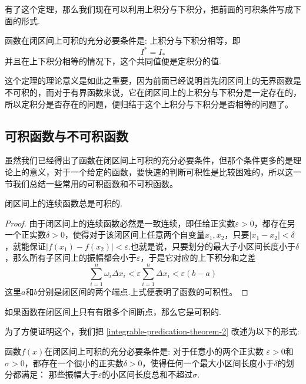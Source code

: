 有了这个定理，那么我们现在可以利用上积分与下积分，把前面的可积条件写成下面的形式.
\begin{theorem}
  函数在闭区间上可积的充分必要条件是: 上积分与下积分相等，即
  \[ I^{*} = I_{*} \]
  并且在上下积分相等的情况下，这个共同值便是定积分的值.
\end{theorem}

这个定理的理论意义是如此之重要，因为前面已经说明首先闭区间上的无界函数是不可积的，而对于有界函数来说，它在闭区间上的上积分与下积分是一定存在的，所以定积分是否存在的问题，便归结于这个上积分与下积分是否相等的问题了。

\subsection{可积函数与不可积函数}
\label{sec:integrable-and-not-function}

虽然我们已经得出了函数在闭区间上可积的充分必要条件，但那个条件更多的是理论上的意义，对于一个给定的函数，要快速的判断可积性是比较困难的，所以这一节我们总结一些常用的可积函数和不可积函数。

\begin{theorem}
  闭区间上的连续函数总是可积的.
\end{theorem}

\begin{proof}
  由于闭区间上的连续函数必然是一致连续，即任给正实数$\varepsilon>0$，都存在另一个正实数$\delta>0$，使得对于该闭区间上任意两个自变量$x_1,x_2$，只要$|x_1-x_2|<\delta$，就能保证$|f(x_1)-f(x_2)|<\varepsilon$.也就是说，只要划分的最大子小区间长度小于$\delta$，那么所有子区间上的振幅都会小于$\varepsilon$，于是它对应的上下积分和之差
  \[ \sum_{i=1}^n \omega_i \Delta x_i < \varepsilon \sum_{i=1}^n \Delta x_i < \varepsilon (b-a) \]
  这里$a$和$b$分别是闭区间的两个端点.上式便表明了函数的可积性。
\end{proof}

\begin{theorem}
  如果函数在闭区间上只有有限多个间断点，那么它是可积的.
\end{theorem}

为了方便证明这个，我们把 \autoref{integrable-predication-theorem-2} 改述为以下的形式:
\begin{theorem}
  \label{integrable-predication-theorem-3}
  函数$f(x)$在闭区间上可积的充分必要条件是: 对于任意小的两个正实数 $\varepsilon>0$和$\sigma>0$，都存在一个很小的正实数$\delta>0$，使得任何一个最大小区间长度小于$\delta$的划分都满足： 那些振幅大于$\varepsilon$的小区间长度总和不超过$\sigma$.
\end{theorem}

